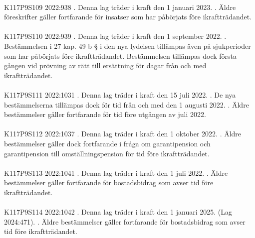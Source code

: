 \documentclass[a4paper,notitlepage,openany,10pt]{book}
\begin{document}
\paragraph*{}
{\tiny K117P9S109}
2022:938
. Denna lag träder i kraft den 1 januari 2023.
. Äldre föreskrifter gäller fortfarande för insatser som har påbörjats före ikraftträdandet.
\paragraph*{}
{\tiny K117P9S110}
2022:939
. Denna lag träder i kraft den 1 september 2022.
. Bestämmelsen i 27 kap. 49 b § i den nya lydelsen tillämpas även på sjukperioder som har påbörjats före ikraftträdandet. Bestämmelsen tillämpas dock första gången vid prövning av rätt till ersättning för dagar från och med ikraftträdandet.
\paragraph*{}
{\tiny K117P9S111}
2022:1031
. Denna lag träder i kraft den 15 juli 2022.
. De nya bestämmelserna tillämpas dock för tid från och med den 1 augusti 2022.
. Äldre bestämmelser gäller fortfarande för tid före utgången av juli 2022.
\paragraph*{}
{\tiny K117P9S112}
2022:1037
. Denna lag träder i kraft den 1 oktober 2022.
. Äldre bestämmelser gäller dock fortfarande i fråga om garantipension och garantipension till omställningspension för tid före ikraftträdandet.
\paragraph*{}
{\tiny K117P9S113}
2022:1041
. Denna lag träder i kraft den 1 juli 2022.
. Äldre bestämmelser gäller fortfarande för bostadsbidrag som avser tid före ikraftträdandet.
\paragraph*{}
{\tiny K117P9S114}
2022:1042
. Denna lag träder i kraft den 1 januari 2025. (Lag 2024:471).
. Äldre bestämmelser gäller fortfarande för bostadsbidrag som avser tid före ikraftträdandet.
\end{document}

